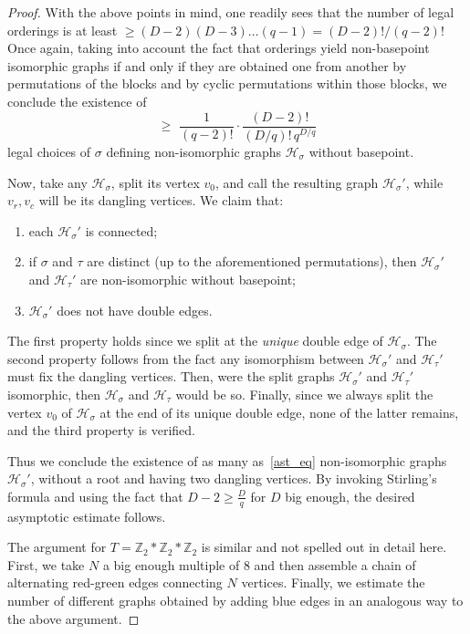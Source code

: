 \documentclass[ALCO,ThmDefs,Unicode,epreuves]{cedram}
\newcommand{\ZZ}{\mathbb{Z}}
\newcommand{\cH}{\mathcal{H}}
\begin{document}
\begin{proof}
With the above points in mind, one readily sees that the number of legal orderings is at least ${\geq} (D-2)(D-3) \dots (q-1) = (D-2)!/(q-2)!$ Once again, taking into account the fact that orderings yield non-basepoint isomorphic graphs if and only if they are obtained one from another by permutations of the blocks and by cyclic permutations within those blocks, we conclude the existence of
\begin{equation}\label{ast_eq}
\geq \,\, \frac{1}{(q-2)!} \cdot \frac{(D-2)!}{(D/q)!\, q^{D/q}} \tag{$\ast$}
\end{equation}
legal choices of $\sigma$ defining non-isomorphic graphs $\cH_\sigma$ without basepoint.


Now, take any $\cH_{\sigma}$, split its vertex $v_{0}$, and call the resulting graph $\cH_{\sigma}'$, while $v_r, v_c$ will be its dangling vertices. We claim that:
\begin{enumerate}
\item each $\cH_{\sigma}'$ is connected; 
\item if $\sigma$ and $\tau$ are distinct (up to the aforementioned permutations), then $\cH_{\sigma}'$ and $\cH_{\tau}'$ are non-isomorphic without basepoint;
\item $\cH_{\sigma}'$ does not have double edges.
\end{enumerate}

The first property holds since we split at the \emph{unique} double edge of $\cH_\sigma$. The second property follows from the fact any isomorphism between $\cH_{\sigma}'$ and $\cH_{\tau}'$ must fix the dangling vertices. Then, were the split graphs $\cH_{\sigma}'$ and $\cH_{\tau}'$ isomorphic, then $\cH_{\sigma}$ and $\cH_{\tau}$ would be so. Finally, since we always split the vertex $v_0$ of $\cH_\sigma$ at the end of its unique double edge, none of the latter remains, and the third property is verified.
 
Thus we conclude the existence of as many as~\eqref{ast_eq} non-isomorphic graphs $\cH_{\sigma}'$, without a root and having two dangling vertices. By invoking Stirling's formula and using the fact that $D-2 \geq \frac{D}{q}$ for $D$ big enough, the desired asymptotic estimate follows.

The argument for $T = \ZZ_2*\ZZ_2*\ZZ_2$ is similar and not spelled out in detail here. First, we take $N$ a big enough multiple of $8$ and then assemble a chain of alternating red-green edges connecting $N$ vertices. Finally, we estimate the number of different graphs obtained by adding blue edges in an analogous way to the above argument.%
\end{proof}
\end{document}
